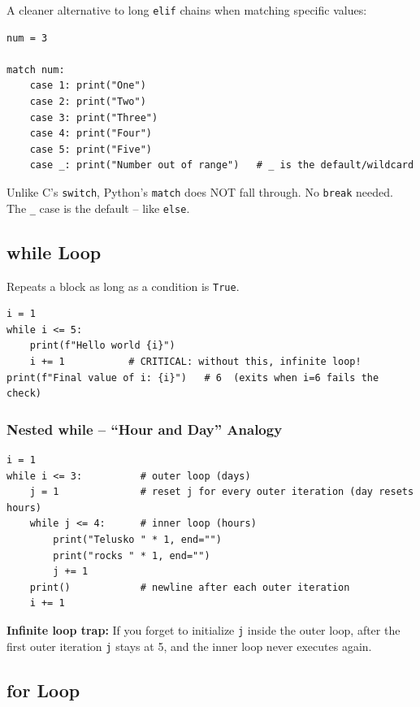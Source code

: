 \documentclass[12pt,a4paper]{article}
\newcommand{\code}[1]{\texttt{\small\color{pyblue}#1}}
\begin{document}
A cleaner alternative to long \code{elif} chains when matching specific values:

\begin{lstlisting}
num = 3

match num:
    case 1: print("One")
    case 2: print("Two")
    case 3: print("Three")
    case 4: print("Four")
    case 5: print("Five")
    case _: print("Number out of range")   # _ is the default/wildcard
\end{lstlisting}

\begin{notebox}
Unlike C's \texttt{switch}, Python's \texttt{match} does NOT fall through. No \code{break} needed. The \code{\_} case is the default -- like \code{else}.
\end{notebox}

\subsection{while Loop}

Repeats a block as long as a condition is \code{True}.

\begin{lstlisting}
i = 1
while i <= 5:
    print(f"Hello world {i}")
    i += 1           # CRITICAL: without this, infinite loop!
print(f"Final value of i: {i}")   # 6  (exits when i=6 fails the check)
\end{lstlisting}

\subsubsection{Nested while -- ``Hour and Day'' Analogy}

\begin{lstlisting}
i = 1
while i <= 3:          # outer loop (days)
    j = 1              # reset j for every outer iteration (day resets hours)
    while j <= 4:      # inner loop (hours)
        print("Telusko " * 1, end="")
        print("rocks " * 1, end="")
        j += 1
    print()            # newline after each outer iteration
    i += 1
\end{lstlisting}

\begin{dangerbox}
\textbf{Infinite loop trap:} If you forget to initialize \code{j} inside the outer loop, after the first outer iteration \code{j} stays at 5, and the inner loop never executes again.
\end{dangerbox}

\subsection{for Loop}
\end{document}
